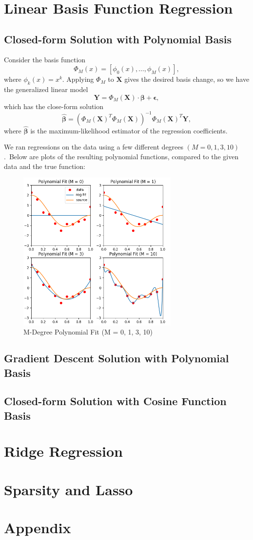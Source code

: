 \documentclass{article}
\begin{document}
\section{Linear Basis Function Regression}

\subsection{Closed-form Solution with Polynomial Basis}
Consider the basis function $$\Phi_M(x) = [\phi_0(x), \dots, \phi_M(x)],$$ where $\phi_k(x) = x^k$. Applying $\Phi_M$ to $\mathbf{X}$ gives the desired basis change, so we have the generalized linear model $$\mathbf Y = \Phi_M(\mathbf X) \cdot \bm \beta + \bm \epsilon,$$ which has the close-form solution $$\hat{\bm \beta} = (\Phi_M(\mathbf X)^T \Phi_M(\mathbf X))^{-1} \Phi_M(\mathbf X)^T \mathbf Y,$$
where $\hat{\bm \beta}$ is the maximum-likelihood estimator of the regression coefficients.

We ran regressions on the data using a few different degrees $(M = 0, 1, 3, 10)$.\footnotemark\ Below are plots of the resulting polynomial functions, compared to the given data and the true function:


\begin{figure}[H]
  \centering
  \includegraphics[width = 3.15in]{../P2/fig/part_1.png}
  \caption{M-Degree Polynomial Fit (M = 0, 1, 3, 10)}
\end{figure}

\subsection{Gradient Descent Solution with Polynomial Basis}

\subsection{Closed-form Solution with Cosine Function Basis}

\section{Ridge Regression}

\section{Sparsity and Lasso}

\section{Appendix}
\end{document}

